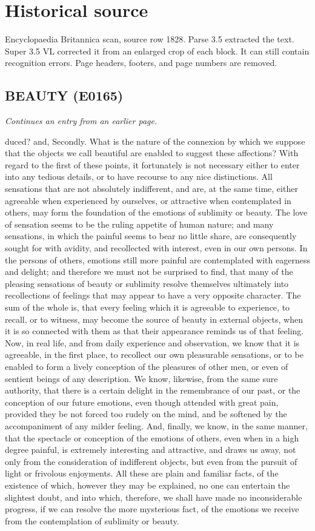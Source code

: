 \documentclass{article}
\begin{document}
\section*{Historical source}
Encyclopaedia Britannica scan, source row 1828. Parse 3.5 extracted the text. Super 3.5 VL corrected it from an enlarged crop of each block. It can still contain recognition errors.
Page headers, footers, and page numbers are removed.

\subsection*{BEAUTY (E0165)}
\textit{Continues an entry from an earlier page.}

duced? and, Secondly. What is the nature of the connexion by which we suppose that the objects we call beautiful are enabled to suggest these affections? With regard to the first of these points, it fortunately is not necessary either to enter into any tedious details, or to have recourse to any nice distinctions. All sensations that are not absolutely indifferent, and are, at the same time, either agreeable when experienced by ourselves, or attractive when contemplated in others, may form the foundation of the emotions of sublimity or beauty. The love of sensation seems to be the ruling appetite of human nature; and many sensations, in which the painful seems to bear no little share, are consequently sought for with avidity, and recollected with interest, even in our own persons. In the persons of others, emotions still more painful are contemplated with eagerness and delight; and therefore we must not be surprised to find, that many of the pleasing sensations of beauty or sublimity resolve themselves ultimately into recollections of feelings that may appear to have a very opposite character. The sum of the whole is, that every feeling which it is agreeable to experience, to recall, or to witness, may become the source of beauty in external objects, when it is so connected with them as that their appearance reminds us of that feeling. Now, in real life, and from daily experience and observation, we know that it is agreeable, in the first place, to recollect our own pleasurable sensations, or to be enabled to form a lively conception of the pleasures of other men, or even of sentient beings of any description. We know, likewise, from the same sure authority, that there is a certain delight in the remembrance of our past, or the conception of our future emotions, even though attended with great pain, provided they be not forced too rudely on the mind, and be softened by the accompaniment of any milder feeling. And, finally, we know, in the same manner, that the spectacle or conception of the emotions of others, even when in a high degree painful, is extremely interesting and attractive, and draws us away, not only from the consideration of indifferent objects, but even from the pursuit of light or frivolous enjoyments. All these are plain and familiar facts, of the existence of which, however they may be explained, no one can entertain the slightest doubt, and into which, therefore, we shall have made no inconsiderable progress, if we can resolve the more mysterious fact, of the emotions we receive from the contemplation of sublimity or beauty.
\end{document}
